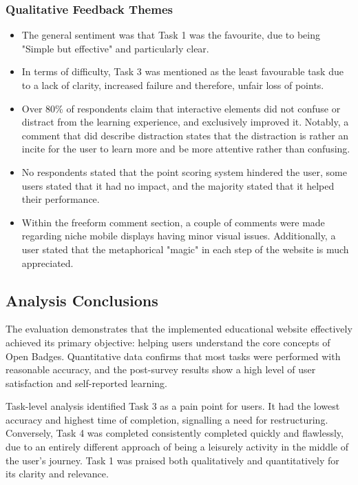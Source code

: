 \subsubsection{Qualitative Feedback Themes}
\begin{itemize}
    \item The general sentiment was that Task 1 was the favourite, due to being "Simple but effective" and particularly clear.
    \item In terms of difficulty, Task 3 was mentioned as the least favourable task due to a lack of clarity, increased failure and therefore, unfair loss of points.
    \item Over 80\% of respondents claim that interactive elements did not confuse or distract from the learning experience, and exclusively improved it. Notably, a comment that did describe distraction states that the distraction is rather an incite for the user to learn more and be more attentive rather than confusing.
    \item No respondents stated that the point scoring system hindered the user, some users stated that it had no impact, and the majority stated that it helped their performance.
    \item Within the freeform comment section, a couple of comments were made regarding niche mobile displays having minor visual issues. 
    Additionally, a user stated that the metaphorical "magic" in each step of the website is much appreciated.
\end{itemize}

\subsection{Analysis Conclusions}

The evaluation demonstrates that the implemented educational website effectively achieved its primary objective: helping users understand the core concepts of Open Badges. 
Quantitative data confirms that most tasks were performed with reasonable accuracy, and the post-survey results show a high level of user satisfaction and self-reported learning.

Task-level analysis identified Task 3 as a pain point for users. 
It had the lowest accuracy and highest time of completion, signalling a need for restructuring. 
Conversely, Task 4 was completed consistently completed quickly and flawlessly, due to an entirely different approach of being a leisurely activity in the middle of the user's journey.
Task 1 was praised both qualitatively and quantitatively for its clarity and relevance.

